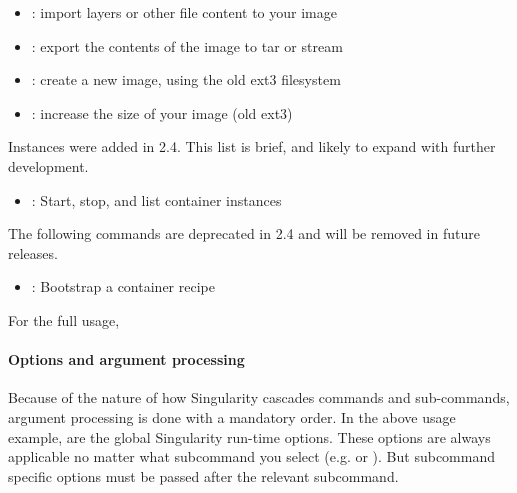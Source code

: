 \documentclass[letterpaper,10pt,english]{sphinxmanual}
\begin{document}
\begin{itemize}
\item {} 
{\hyperref[\detokenize{appendix:image-import}]{}} : import layers or other file content to your image

\item {} 
{\hyperref[\detokenize{appendix:image-export}]{}} : export the contents of the image to tar or stream

\item {} 
{\hyperref[\detokenize{appendix:image-create}]{}} : create a new image, using the old ext3 filesystem

\item {} 
{\hyperref[\detokenize{appendix:image-expand}]{}} : increase the size of your image (old ext3)

\end{itemize}


Instances were added in 2.4. This list is brief, and likely to expand
with further development.
\begin{itemize}
\item {} 
{\hyperref[\detokenize{running_services:running-services}]{}} : Start, stop, and list container instances

\end{itemize}

The following commands are deprecated in 2.4 and will be removed in
future releases.
\begin{itemize}
\item {} 
{\hyperref[\detokenize{appendix:bootstrap}]{}} : Bootstrap a container recipe

\end{itemize}

For the full usage, {\hyperref[\detokenize{appendix:command-usage}]{}}


\paragraph{Options and argument processing}
\label{\detokenize{appendix:options-and-argument-processing}}
Because of the nature of how Singularity cascades commands and
sub-commands, argument processing is done with a mandatory order.
 In the
above usage example,  are the global Singularity run-time options.
These options are always applicable no matter what subcommand you
select (e.g.  or  ). But subcommand specific options must be passed
after the relevant subcommand.
\end{document}

